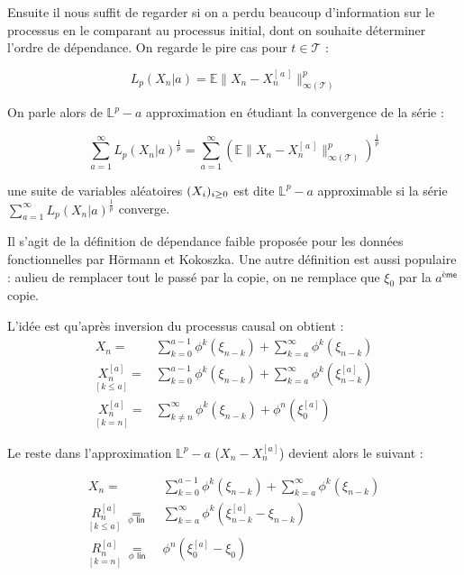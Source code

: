 \bigskip

Ensuite il nous suffit de regarder si on a perdu beaucoup d'information sur le processus en le comparant au processus initial, dont on souhaite déterminer l'ordre de dépendance. On regarde le pire cas pour $t \in \mathcal T$ :

$$L_p(X_n | a ) = {\mathds E  \lVert {X_n} - {X_n^{[\, a \, ]}} } \rVert_{\infty(\mathcal T)} ^p$$

On parle alors de $\mathds L^p-a$ approximation en étudiant la convergence de la série :

$$\sum\limits_{a=1}^\infty L_p(X_n | a )^{\frac 1 p} = \sum\limits_{a=1}^\infty \left({\mathds E  \lVert {X_n} - {X_n^{[\, a \, ]}} } \rVert_{\infty(\mathcal T)} ^p\right)^{\frac 1 p}$$

\begin{definition}
    une suite de variables aléatoires $( {X}_{i})_{i \geq 0}$ est dite $\mathds L^p - a$ approximable si la série $\sum\limits_{a=1}^\infty L_p(X_n | a )^{\frac 1 p}$ converge.
\end{definition}


Il s'agit de la définition de dépendance faible proposée pour les données fonctionnelles par Hörmann et Kokoszka\cite{weakly-dependent-functional-data}. Une autre définition est aussi populaire : aulieu de remplacer tout le passé par la copie, on ne remplace que $\xi_0$ par la $a^{\textsf{ème}}$ copie.

L'idée est qu'après inversion du processus causal on obtient :
\begin{align*}
    X_n = &\sum\limits_{k=0}^{a-1} \phi^k( \xi_{n-k}) + \sum\limits_{k=a}^{\infty} \phi^k( \xi_{n-k})
    \\
    \underset {[k\leq a]} {X_n^{[a]}} = &\sum\limits_{k=0}^{a-1} \phi^k( \xi_{n-k}) + \sum\limits_{k=a}^{\infty} \phi^k( \xi_{n-k}^{[a]})
    \\
    \underset {[k = n]} {X_n^{[a]}} = &\sum\limits_{k \neq n}^{\infty} \phi^k( \xi_{n-k}) + \phi^n( \xi_{0}^{[a]})
\end{align*}

Le reste dans l'approximation $\mathds L^p-a$ ($X_n - X_n^{[a]}$) devient alors le suivant :

\begin{align*}
    X_n = &\sum\limits_{k=0}^{a-1} \phi^k( \xi_{n-k}) + \sum\limits_{k=a}^{\infty} \phi^k( \xi_{n-k})
    \\
    \underset {[k\leq a]} {R_n^{[a]}} \; \underset {\phi \textsf{ lin}}{=} \; &\sum\limits_{k=a}^{\infty} \phi^k( \xi_{n-k}^{[a]} - \xi_{n-k})
    \\
    \underset {[k = n]} {R_n^{[a]}} \; \underset {\phi \textsf{ lin}}{=} \; &\phi^n( \xi_{0}^{[a]} - \xi_0)
\end{align*}


